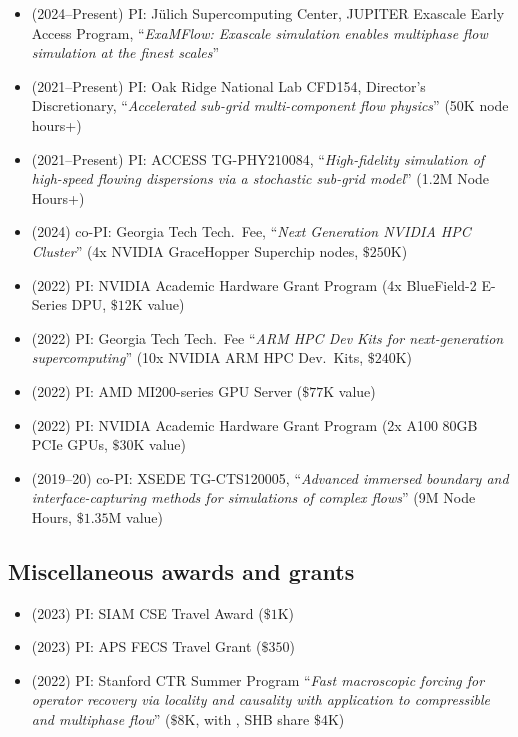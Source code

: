 \begin{itemize}
    \item (2024--Present) PI: J\"ulich Supercomputing Center, JUPITER Exascale Early Access Program, ``\textit{ExaMFlow: Exascale simulation enables multiphase flow simulation at the finest scales}''
    \item (2021--Present) PI: Oak Ridge National Lab CFD154, Director's Discretionary, ``\textit{Accelerated sub-grid multi-component flow physics}'' (50K node hours+)
    \item (2021--Present) PI: ACCESS TG-PHY210084, ``\textit{High-fidelity simulation of high-speed flowing dispersions via a stochastic sub-grid model}'' (1.2M Node Hours+)
    \item (2024) co-PI: Georgia Tech Tech.\ Fee, ``\textit{Next Generation NVIDIA HPC Cluster}'' (4x NVIDIA GraceHopper Superchip nodes, $\$250$K)
    \item (2022) PI: NVIDIA Academic Hardware Grant Program (4x BlueField-2 E-Series DPU, $\$12$K value)
    \item (2022) PI: Georgia Tech Tech.\ Fee ``\textit{ARM HPC Dev Kits for next-generation supercomputing}'' (10x NVIDIA ARM HPC Dev.\ Kits, $\$240$K)
    \item (2022) PI: AMD MI200-series GPU Server ($\$77$K value)
    \item (2022) PI: NVIDIA Academic Hardware Grant Program (2x A100 80GB PCIe GPUs, $\$30$K value)
    \item (2019--20) co-PI: XSEDE TG-CTS120005, ``\textit{Advanced immersed boundary and interface-capturing methods for simulations of complex flows}'' (9M Node Hours, $\$1.35$M value)
\end{itemize}

\subsection{Miscellaneous awards and grants}

\begin{itemize}
    \item (2023) PI: SIAM CSE Travel Award ($\$1$K)
    \item (2023) PI: APS FECS Travel Grant ($\$350$)
    \item (2022) PI: Stanford CTR Summer Program ``\textit{Fast macroscopic forcing for operator recovery via locality and causality with application to compressible and multiphase flow}'' ($\$8$K, with \Florian, SHB share $\$4$K)
\end{itemize}


